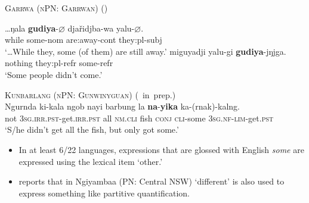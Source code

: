 \documentclass{article}
\begin{document}

\begin{exe}
  \ex \textsc{Garrwa (nPN: Garrwan)} (\citealt[19,37]{furby77})
  \begin{xlist}
    \ex \gll \ldots{}ŋala     \textbf{gudiya}-$\varnothing$    dja\v{r}idjba-wa    yalu-$\varnothing.$\\
    \phantom{\ldots}while     some-{\sc nom}    are:away-{\sc cont}    they:{\sc pl-subj}\\
    \glt   `\ldots{}While they, some (of them) are still away.'
    \ex  \gll  miguyadji    yalu-gi    \textbf{gudiya}-jŋjga. \\
    nothing    they:{\sc pl-refr}    some-{\sc refr} \\
    \glt   `Some people didn’t come.'
  \end{xlist}

  \ex \textsc{Kunbarlang (nPN: Gunwinyguan)} (\citealt{ikthesis}~in~prep.)\\
  \gll Ngurnda ki-kala ngob nayi barbung la \textbf{na}-\textbf{yika} ka-(rnak)-kalng.\\
  not \textsc{3sg.irr.pst}-get.\textsc{irr.pst} all \textsc{nm.cli} fish \textsc{conj} \textsc{cli}-some \textsc{3sg.nf}-\textsc{lim}-get.\textsc{pst}\\
  \glt `S/he didn't get all the fish, but only got some.' %
  
\end{exe}

\begin{itemize}
    \item  In at least 6/22 languages, expressions that are glossed with English \textit{some} are expressed using the lexical item `other.' 
    \item \citet[73]{donaldson80} reports that in Ngiyambaa (PN: Central NSW) `different' is also used to express something like partitive quantification. %
\end{itemize}
\end{document}

